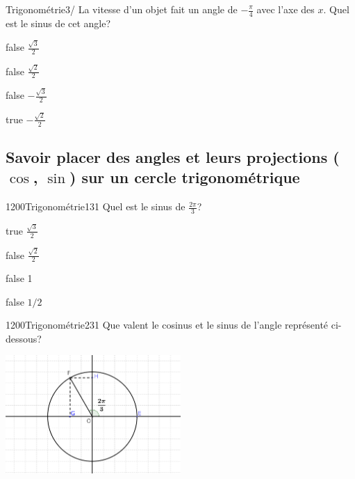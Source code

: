 \documentclass[11pt]{article}
\begin{document}
        	\begin{question}{31}{Trigonométrie}{3}{/}
				La vitesse d'un objet fait un angle de $-\frac{\pi}{4}$ avec l'axe des $x$. Quel est le sinus de cet angle?
            \end{question}

            \begin{reponses}
            	\item[false] $\frac{\sqrt{3}}{2}$
            	\item[false] $\frac{\sqrt{2}}{2}$
                \item[false] $-\frac{\sqrt{3}}{2}$
                \item[true] $-\frac{\sqrt{2}}{2}$
            \end{reponses}
    
		\subsection{Savoir placer des angles et leurs projections ($\cos$, $\sin$) sur un cercle trigonométrique}
        
        	\begin{question}{1200}{Trigonométrie}{1}{31}
				Quel est le sinus de $\frac{2\pi}{3}$?
            \end{question}

            \begin{reponses}
            	\item[true] $\frac{\sqrt{3}}{2}$
            	\item[false] $\frac{\sqrt{2}}{2}$
                \item[false] 1
                \item[false] $1/2$
            \end{reponses}

            \begin{question}{1200}{Trigonométrie}{2}{31}
                Que valent le cosinus et le sinus de l'angle représenté ci-dessous?
                \begin{center}
                	\includegraphics[width=0.5\textwidth]{Philippe/Figures_Philippe/trigo_1_4.png}
                \end{center}
            \end{question}
\end{document}
